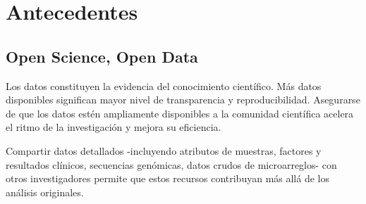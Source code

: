 \documentclass[
10pt, %
letterpaper, %
oneside, %
headinclude,footinclude, %
BCOR5mm, %
]{scrartcl}
\title{\normalfont\spacedallcaps{Banco de Datos INMEGEN}}
\author{\spacedlowsmallcaps{Rodrigo García Herrera}}
\date{} %
\begin{document}

\renewcommand{\sectionmark}[1]{\markright{\spacedlowsmallcaps{#1}}} %
\lehead{\mbox{\llap{\small\thepage\kern1em\color{halfgray} \vline}\color{halfgray}\hspace{0.5em}\rightmark\hfil}} %

\pagestyle{scrheadings} %



\maketitle %
\setcounter{tocdepth}{2} %
\tableofcontents %




\section{Antecedentes}


\subsection{Open Science, Open Data}

Los datos constituyen la evidencia del conocimiento científico. Más
datos disponibles significan mayor nivel de transparencia y
reproducibilidad. Asegurarse de que los datos estén ampliamente
disponibles a la comunidad científica acelera el ritmo de la
investigación y mejora su eficiencia. \cite{walport_sharing_2011}

Compartir datos detallados -incluyendo atributos de muestras, factores
y resultados clínicos, secuencias genómicas, datos crudos de
microarreglos- con otros investigadores permite que estos recursos
contribuyan más allá de los análisis originales.
\end{document}
